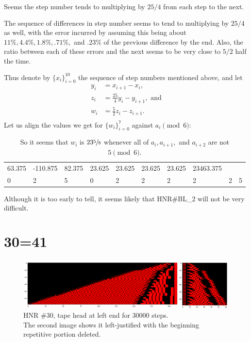 \documentclass[12pt]{article}
\begin{document}
Seems the step number tends to multiplying by $25/4$ from each step to the next.

The sequence of differences in step number seems to tend to multiplying by $25/4$ as well,
with the error incurred by assuming this being about
$11\%, 4.4\%, 1.8\%, .71\%,$ and $.23\%$ of the previous difference by the end.
Also, the ratio between each of these errors and the next seems to be very close to $5/2$ half the time.

Thus denote by $\{x_i\}_{i=0}^{10}$ the sequence of step numbers mentioned above, and let
\begin{align*}
y_i&=x_{i+1}-x_{i},\\
z_i&=\frac{25}{4}y_i-y_{i+1},\textrm{ and}\\
w_i&=\frac{5}{2}z_i-z_{i+1}.\\
\end{align*}
Let us align the values we get for $\{w_i\}_{i=0}^{7}$ against $a_i\pmod6$:
\begin{table}[H]
\begin{tabular}{llllllllll}
63.375&-110.875&82.375&23.625&23.625&23.625&23.625&23463.375&{}&{}\\
0&2&5&0&2&2&2&2&2&5
\end{tabular}
\caption*{So it seems that $w_i$ is $23\sfrac{5}{8}$ whenever all of $a_i,a_{i+1},$ and $a_{i+2}$ are not $5\pmod6.$}
\end{table}
Although it is too early to tell, it seems likely that HNR\#BL\_2 will not be very difficult.

\clearpage
{}
{}
\section*{30=41}

\begin{figure}[H]
\centering
\includegraphics[width=\textwidth]{30.png}
\caption{HNR \#30, tape head at left end for 30000 steps.\\
The second image shows it left-justified with the beginning repetitive portion deleted.}
\end{figure}
\end{document}
